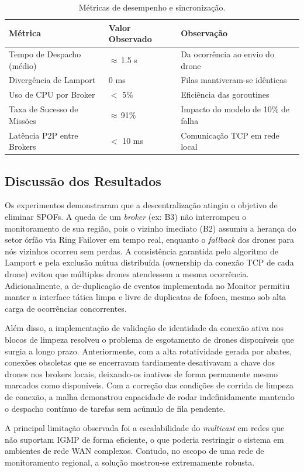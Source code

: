 \begin{table}[ht]
  \centering
  \caption{Métricas de desempenho e sincronização.}
  \label{tab:performance}
  \begin{tabular}{p{5cm}p{3.5cm}p{4.5cm}}
    \toprule
    \textbf{Métrica} & \textbf{Valor Observado} & \textbf{Observação} \\
    \midrule
    Tempo de Despacho (médio) & $\approx$\,1.5 s & Da ocorrência ao envio do drone \\
    Divergência de Lamport & 0 ms & Filas mantiveram-se idênticas \\
    Uso de CPU por Broker & $<$ 5\% & Eficiência das goroutines \\
    Taxa de Sucesso de Missões & $\approx$\,91\% & Impacto do modelo de 10\% de falha \\
    Latência P2P entre Brokers & $<$ 10 ms & Comunicação TCP em rede local \\
    \bottomrule
  \end{tabular}
\end{table}

\subsection{Discussão dos Resultados}

Os experimentos demonstraram que a descentralização atingiu o objetivo de eliminar SPOFs. A queda de um \textit{broker} (ex: B3) não interrompeu o monitoramento de sua região, pois o vizinho imediato (B2) assumiu a herança do setor órfão via Ring Failover em tempo real, enquanto o \textit{fallback} dos drones para nós vizinhos ocorreu sem perdas. A consistência garantida pelo algoritmo de Lamport e pela exclusão mútua distribuída (ownership da conexão TCP de cada drone) evitou que múltiplos drones atendessem a mesma ocorrência. Adicionalmente, a de-duplicação de eventos implementada no Monitor permitiu manter a interface tática limpa e livre de duplicatas de fofoca, mesmo sob alta carga de ocorrências concorrentes.

Além disso, a implementação de validação de identidade da conexão ativa nos blocos de limpeza resolveu o problema de esgotamento de drones disponíveis que surgia a longo prazo. Anteriormente, com a alta rotatividade gerada por abates, conexões obsoletas que se encerravam tardiamente desativavam a chave dos drones nos brokers locais, deixando-os inativos de forma permanente mesmo marcados como disponíveis. Com a correção das condições de corrida de limpeza de conexão, a malha demonstrou capacidade de rodar indefinidamente mantendo o despacho contínuo de tarefas sem acúmulo de fila pendente.

A principal limitação observada foi a escalabilidade do \textit{multicast} em redes que não suportam IGMP de forma eficiente, o que poderia restringir o sistema em ambientes de rede WAN complexos. Contudo, no escopo de uma rede de monitoramento regional, a solução mostrou-se extremamente robusta.
